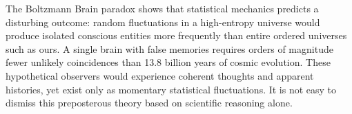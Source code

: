The Boltzmann Brain paradox shows that statistical mechanics predicts a disturbing outcome: random fluctuations in a high-entropy universe would produce isolated conscious entities more frequently than entire ordered universes such as ours. A single brain with false memories requires orders of magnitude fewer unlikely coincidences than 13.8 billion years of cosmic evolution. These hypothetical observers would experience coherent thoughts and apparent histories, yet exist only as momentary statistical fluctuations. It is not easy to dismiss this preposterous theory based on scientific reasoning alone.
